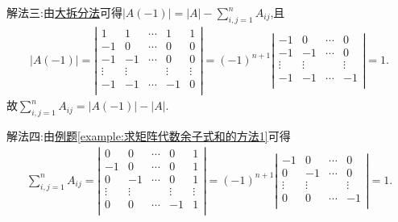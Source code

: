 \documentclass[../../main.tex]{subfiles}
\begin{document}
\begin{solution}
{\color{blue}解法三:}由\hyperref[大拆分法]{大拆分法}可得$\left| A\left( -1 \right) \right|=\left| A \right|-\sum_{i,j=1}^n{A_{ij}}$,且
\begin{align*}
\left| A\left( -1 \right) \right|=\left| \begin{matrix}
1&		1&		\cdots&		1&		1\\
-1&		0&		\cdots&		0&		0\\
-1&		-1&		\cdots&		0&		0\\
\vdots&		\vdots&		&		\vdots&		\vdots\\
-1&		-1&		\cdots&		-1&		0\\
\end{matrix} \right|=\left( -1 \right) ^{n+1}\left| \begin{matrix}
-1&		0&		\cdots&		0\\
-1&		-1&		\cdots&		0\\
\vdots&		\vdots&		&		\vdots\\
-1&		-1&		\cdots&		-1\\
\end{matrix} \right|=1.
\end{align*}
故$\sum_{i,j=1}^n{A_{ij}}=\left| A\left( -1 \right) \right|-\left| A \right|$.

{\color{blue}解法四:}由\hyperref[example:求矩阵代数余子式和的方法1]{例题\ref{example:求矩阵代数余子式和的方法1}}可得
\begin{align*}
\sum_{i,j=1}^n{A_{ij}}=\left| \begin{matrix}
0&		0&		\cdots&		0&		1\\
-1&		0&		\cdots&		0&		1\\
0&		-1&		\cdots&		0&		1\\
\vdots&		\vdots&		&		\vdots&		\vdots\\
0&		0&		\cdots&		-1&		1\\
\end{matrix} \right|=(-1)^{n+1}\left| \begin{matrix}
-1&		0&		\cdots&		0\\
0&		-1&		\cdots&		0\\
\vdots&		\vdots&		&		\vdots\\
0&		0&		\cdots&		-1\\
\end{matrix} \right|=1.
\end{align*}
\end{solution}
\end{document}
